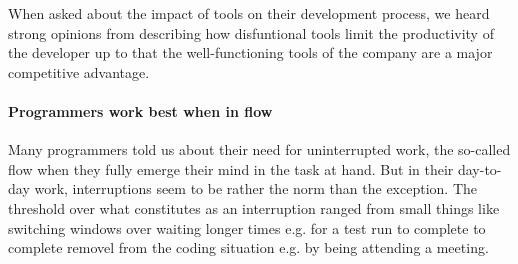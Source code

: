 When asked about the impact of tools on their development process, we heard strong opinions from describing how disfuntional tools limit the productivity of the developer up to that the well-functioning tools of the company are a major competitive advantage.

\paragraph{Programmers work best when in flow} Many programmers told us about their need for uninterrupted work, the so-called flow when they fully emerge their mind in the task at hand. But in their day-to-day work, interruptions seem to be rather the norm than the exception. The threshold over what constitutes as an interruption ranged from small things like switching windows over waiting longer times e.g. for a test run to complete to complete removel from the coding situation e.g. by being attending a meeting.
